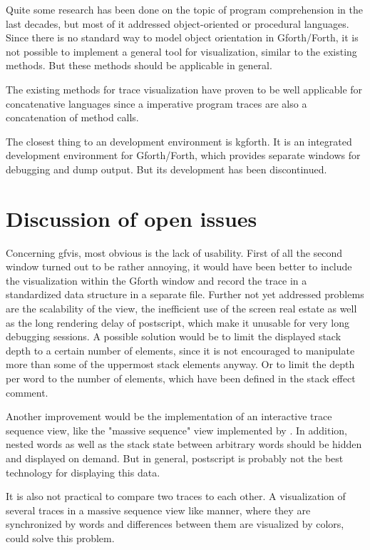 Quite some research has been done on the topic of program comprehension in the last decades, but most of it addressed object-oriented or procedural languages. Since there is no standard way to model object orientation in Gforth/Forth, it is not possible to implement a general tool for visualization, similar to the existing methods. But these methods should be applicable in general.

The existing methods for trace visualization have proven to be well applicable for concatenative languages since a imperative program traces are also a concatenation of method calls.

The closest thing to an development environment is kgforth. It is an integrated development environment for Gforth/Forth, which provides separate windows for debugging and dump output. But its development has been discontinued.

\section{Discussion of open issues}

Concerning gfvis, most obvious is the lack of usability. First of all the second window turned out to be rather annoying, it would have been better to include the visualization within the Gforth window and record the trace in a standardized data structure in a separate file.
Further not yet addressed problems are the scalability of the view, the inefficient use of the screen real estate as well as the long rendering delay of postscript, which make it unusable for very long debugging sessions. A possible solution would be to limit the displayed stack depth to a certain number of elements, since it is not encouraged to manipulate more than some of the uppermost stack elements anyway. Or to limit the depth per word to the number of elements, which have been defined in the stack effect comment.

Another improvement would be the implementation of an interactive trace sequence view, like the "massive sequence" view implemented by \cite{Cornelissen:2008:ETA:1454787.1454981}. In addition, nested words as well as the stack state between arbitrary words should be hidden and displayed on demand. But in general, postscript is probably not the best technology for displaying this data.

It is also not practical to compare two traces to each other. A visualization of several traces in a massive sequence view like manner, where they are synchronized by words and differences between them are visualized by colors, could solve this problem.

